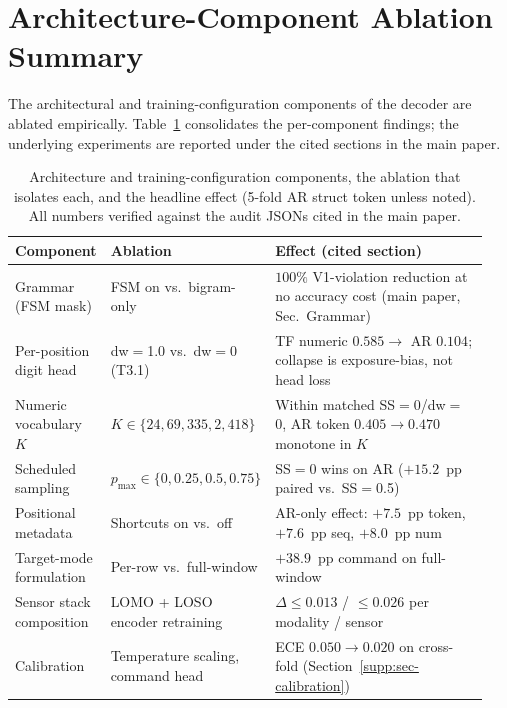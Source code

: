 \documentclass[11pt,a4paper]{article}
\begin{document}
\section{Architecture-Component Ablation Summary}
\label{supp:sec-arch-ablation-summary}

The architectural and training-configuration components of the decoder are ablated empirically. Table~\ref{tab:component_ablation_summary} consolidates the per-component findings; the underlying experiments are reported under the cited sections in the main paper.

\begin{table}[ht]
\centering
\caption{Architecture and training-configuration components, the ablation that isolates each, and the headline effect (5-fold AR struct token unless noted). All numbers verified against the audit JSONs cited in the main paper.}
\label{tab:component_ablation_summary}
\footnotesize
\setlength{\tabcolsep}{3pt}
\begin{tabular}{@{}p{0.20\linewidth} p{0.24\linewidth} p{0.50\linewidth}@{}}
\toprule
\textbf{Component} & \textbf{Ablation} & \textbf{Effect (cited section)} \\
\midrule
Grammar (FSM mask)         & FSM on vs.\ bigram-only       & $100\%$ V1-violation reduction at no accuracy cost (main paper, Sec.\ Grammar) \\
Per-position digit head    & dw$=$1.0 vs.\ dw$=$0 (T3.1)   & TF numeric $0.585 \to$ AR $0.104$; collapse is exposure-bias, not head loss \\
Numeric vocabulary $K$     & $K\!\in\!\{24, 69, 335, 2{,}418\}$ & Within matched SS$=$0/dw$=$0, AR token $0.405 \to 0.470$ monotone in $K$ \\
Scheduled sampling         & $p_{\max}\!\in\!\{0, 0.25, 0.5, 0.75\}$ & SS$=$0 wins on AR ($+15.2$~pp paired vs.\ SS$=$0.5) \\
Positional metadata        & Shortcuts on vs.\ off          & AR-only effect: $+7.5$~pp token, $+7.6$~pp seq, $+8.0$~pp num \\
Target-mode formulation    & Per-row vs.\ full-window       & $+38.9$~pp command on full-window \\
Sensor stack composition   & LOMO + LOSO encoder retraining & $\Delta \le 0.013$ / $\le 0.026$ per modality / sensor \\
Calibration                & Temperature scaling, command head & ECE $0.050 \to 0.020$ on cross-fold (Section~\ref{supp:sec-calibration}) \\
\bottomrule
\end{tabular}
\end{table}
\end{document}
